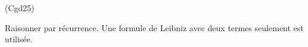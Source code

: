 \begin{tiny}(Cgd25)\end{tiny} Raisonner par récurrence. Une formule de Leibniz avec deux termes seulement est utilisée.